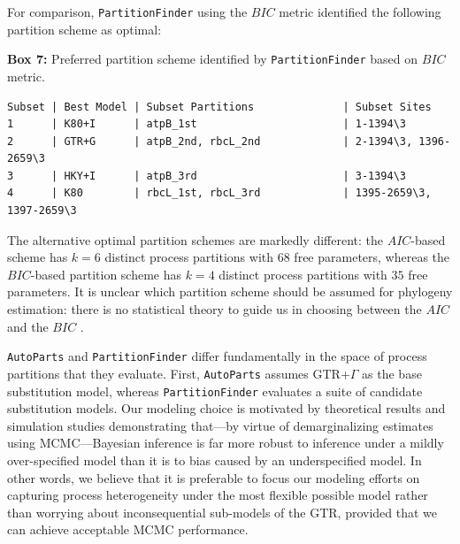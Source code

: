 \documentclass[11pt]{article}
\begin{document}
For comparison, \verb!PartitionFinder! using the $BIC$ metric identified the following partition scheme as optimal:
\begin{center}
{\bf Box 7:} Preferred partition scheme identified by \verb!PartitionFinder! based on $BIC$ metric. \\
\end{center}
{\tt \scriptsize \begin{framed}
\begin{lstlisting}
Subset | Best Model | Subset Partitions              | Subset Sites            
1      | K80+I      | atpB_1st                       | 1-1394\3                
2      | GTR+G      | atpB_2nd, rbcL_2nd             | 2-1394\3, 1396-2659\3   
3      | HKY+I      | atpB_3rd                       | 3-1394\3                
4      | K80        | rbcL_1st, rbcL_3rd             | 1395-2659\3, 1397-2659\3
\end{lstlisting}
\end{framed}}
The alternative optimal partition schemes are markedly different: the $AIC$-based scheme has $k = 6$ distinct process partitions with $68$ free parameters, whereas the $BIC$-based partition scheme has $k = 4$ distinct process partitions with $35$ free parameters.
It is unclear which partition scheme should be assumed for phylogeny estimation: there is no statistical theory to guide us in choosing between the $AIC$ and the $BIC$ \citep[{\it e.g.},][]{kass95}.  

\verb!AutoParts! and \verb!PartitionFinder! differ fundamentally in the space of process partitions that they evaluate.
First, \verb!AutoParts! assumes GTR+$\Gamma$ as the base substitution model, whereas \verb!PartitionFinder! evaluates a suite of candidate substitution models.
Our modeling choice is motivated by theoretical results and simulation studies \citep[{\it e.g.},][]{huelsenbeck04b} demonstrating that---by virtue of demarginalizing estimates using MCMC---Bayesian inference is far more robust to inference under a mildly over-specified model than it is to bias caused by an underspecified model.
In other words, we believe that it is preferable to focus our modeling efforts on capturing process heterogeneity under the most flexible possible model rather than worrying about inconsequential sub-models of the GTR, provided that we can achieve acceptable MCMC performance. 
\end{document}
